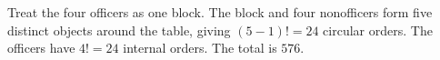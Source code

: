 Treat the four officers as one block. The block and four nonofficers form five distinct objects around the table, giving $(5-1)!=24$ circular orders. The officers have $4!=24$ internal orders. The total is $\boxed{576}$.
